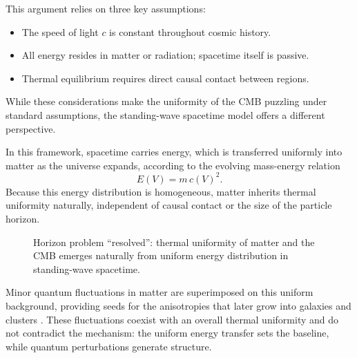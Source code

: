\documentclass[12pt]{article}
\begin{document}
This argument relies on three key assumptions:
\begin{itemize}
\item The speed of light \(c\) is constant throughout cosmic history.
\item All energy resides in matter or radiation; spacetime itself is passive.
\item Thermal equilibrium requires direct causal contact between regions.
\end{itemize}

While these considerations make the uniformity of the CMB puzzling under standard assumptions, the standing-wave spacetime model offers a different perspective.

In this framework, spacetime carries energy, which is transferred uniformly into matter as the universe expands, according to the evolving mass-energy relation
\begin{equation}
E(V) = m\,c(V)^2.
\end{equation}
Because this energy distribution is homogeneous, matter inherits thermal uniformity naturally, independent of causal contact or the size of the particle horizon.

\begin{figure}[h!]
\centering
{}
\caption{Horizon problem “resolved”: thermal uniformity of matter and the CMB emerges naturally from uniform energy distribution in standing-wave spacetime.}
\label{fig:horizon_flow}
\end{figure}

Minor quantum fluctuations in matter are superimposed on this uniform background, providing seeds for the anisotropies that later grow into galaxies and clusters \cite{mukhanov1992}. These fluctuations coexist with an overall thermal uniformity and do not contradict the mechanism: the uniform energy transfer sets the baseline, while quantum perturbations generate structure.
\end{document}

